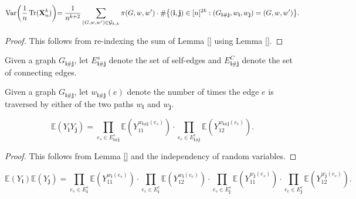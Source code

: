 \begin{lemma}[R-2-5]
  \label{}%
  \uses{}%
  \[
  \text{Var} \biggl(\frac{1}{n} \operatorname{Tr} (\mathbf{X}_n^k) \biggl) 
  = \frac{1}{n^{k+2}} \sum_{(G,w,w') \in \mathcal{G}_{k,k}} \pi(G,w,w')
\cdot \# \bigl\{ (\mathbf{i},\mathbf{j}) \in [n]^{2k} : (G_{\mathbf{i} \# \mathbf{j}},w_\mathbf{i},w_\mathbf{j}) = (G,w,w') \bigl\}.
  \]
\end{lemma}
\begin{proof}
  This follows from re-indexing the sum of Lemma \ref{} using Lemma \ref{}.
\end{proof}
\begin{definition}[R-2-6]
  \label{}%
  \uses{}%
  Given a graph $G_{\mathbf{i} \# \mathbf{j}}$, 
  let $E^s_{\mathbf{i} \# \mathbf{j}}$ denote the set of self-edges and $E^C_{\mathbf{i} \# \mathbf{j}}$ denote the set of connecting edges.
\end{definition}
\begin{definition}[R-2-7]
  \label{}%
  \uses{}%
  Given a graph $G_{\mathbf{i} \# \mathbf{j}}$, 
  let $w_{\mathbf{i} \# \mathbf{j}}(e)$ denote the number of times the edge $e$ is traversed by either of the two paths $w_\mathbf{i}$ and $w_\mathbf{j}$.
\end{definition}
\begin{lemma}[R-2-8]
  \label{}%
  \uses{}%
  \[
  \mathbb{E} (Y_\mathbf{i}Y_\mathbf{j}) 
  = \prod_{e_s \in E^s_{\mathbf{i} \# \mathbf{j}}} \mathbb{E} (Y_{11}^{w_{\mathbf{i} \# \mathbf{j}}(e_s)}) \cdot \prod_{e_c \in E^c_{\mathbf{i} \# \mathbf{j}}} \mathbb{E} (Y_{12}^{w_{\mathbf{i} \# \mathbf{j}}(e_c)}).
  \]
\end{lemma}
\begin{proof}
  This follows from Lemma \ref{} and the independency of random variables.
\end{proof}
\begin{lemma}[R-2-9]
  \label{}%
  \uses{}%
  \[
  \mathbb{E}(Y_\mathbf{i}) \mathbb{E}(Y_\mathbf{j}) 
  = \prod_{e_s \in E^s_{\mathbf{i}}} \mathbb{E} (Y_{11}^{w_{\mathbf{i}}(e_s)}) \cdot \prod_{e_c \in E^c_{\mathbf{i}}} \mathbb{E} (Y_{12}^{w_{\mathbf{i}}(e_c)})
  \cdot \prod_{e_s \in E^s_{\mathbf{j}}} \mathbb{E} (Y_{11}^{w_{\mathbf{j}}(e_s)}) \cdot \prod_{e_c \in E^c_{\mathbf{j}}} \mathbb{E} (Y_{12}^{w_{\mathbf{j}}(e_c)}).
  \]
\end{lemma}
